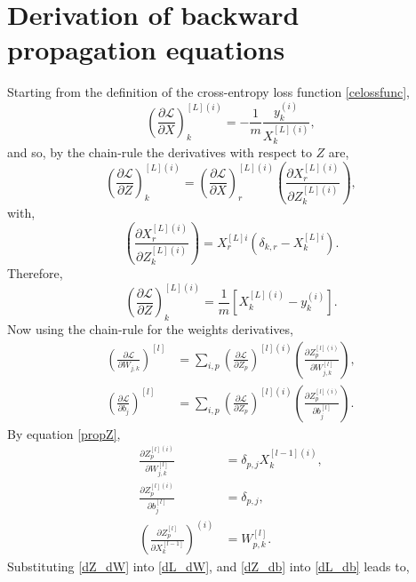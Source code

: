 \documentclass[11pt,twocolumn]{article}
\begin{document}
\section{Derivation of backward propagation equations}\label{backprop_derive}
Starting from the definition of the cross-entropy loss function \ref{celossfunc}, 
\begin{equation}
\left(\frac{\partial \mathcal{L}}{\partial X}\right)^{[L](i)}_k=-\frac{1}{m}\frac{y^{(i)}_k}{X^{[L](i)}_k},
\end{equation}
and so, by the chain-rule the derivatives with respect to $Z$ are,
\begin{equation}
\left(\frac{\partial \mathcal{L}}{\partial Z}\right)^{[L](i)}_k=\left(\frac{\partial \mathcal{L}}{\partial X}\right)^{[L](i)}_r \left(\frac{\partial X^{[L](i)}_r}{\partial Z^{[L](i)}_k}\right),
\end{equation}
with,
\begin{equation}
\left(\frac{\partial X^{[L](i)}_r}{\partial Z^{[L](i)}_k}\right)=X_{r}^{[L]i}(\delta_{k,r} - X_{k}^{[L]i}).
\end{equation}
Therefore,
\begin{equation}
\left(\frac{\partial \mathcal{L}}{\partial Z}\right)^{[L](i)}_k=\frac{1}{m}\left[X^{[L](i)}_k-y^{(i)}_k\right].
\end{equation}
Now using the chain-rule for the weights derivatives,
\begin{align}
\left(\frac{\partial \mathcal{L}}{\partial W_{j,k}}\right)^{[l]}&=\sum_{i,p}\left(\frac{\partial \mathcal{L}}{\partial Z_{p}}\right)^{[l](i)}\left(\frac{\partial Z_{p}^{[l](i)}}{\partial W_{j,k}^{[l]}}\right),\label{dL_dW}\\
\left(\frac{\partial \mathcal{L}}{\partial b_{j}}\right)^{[l]}&=\sum_{i,p}\left(\frac{\partial \mathcal{L}}{\partial Z_{p}}\right)^{[l](i)}\left(\frac{\partial Z_{p}^{[l](i)}}{\partial b_{j}^{[l]}}\right).\label{dL_db}
\end{align}
By equation \ref{propZ},
\begin{align}
\frac{\partial Z_{p}^{[l](i)}}{\partial W_{j,k}^{[l]}}&=\delta_{p,j}X_{k}^{[l-1](i)},\label{dZ_dW}\\
\frac{\partial Z_{p}^{[l](i)}}{\partial b_{j}^{[l]}}&=\delta_{p,j},\label{dZ_db}\\
\left(\frac{\partial Z_{p}^{[l]}}{\partial X_{k}^{[l-1]}}\right)^{(i)}&=W_{p,k}^{[l]}.\label{dZ_dX}
\end{align}
Substituting \ref{dZ_dW} into \ref{dL_dW}, and \ref{dZ_db} into \ref{dL_db} leads to,
\end{document}

